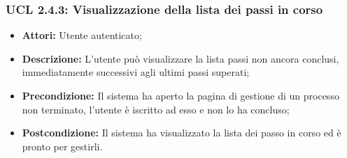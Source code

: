 \subsubsection{UCL 2.4.3: Visualizzazione della lista dei passi in corso}
\begin{itemize}
\item \textbf{Attori:} Utente autenticato;
\item \textbf{Descrizione:} L'utente può visualizzare la lista passi non ancora conclusi, immediatamente successivi agli ultimi passi superati;
\item \textbf{Precondizione:} Il sistema ha aperto la pagina di gestione di un processo non terminato, l'utente è iscritto ad esso e non lo ha concluso;
\item \textbf{Postcondizione:} Il sistema ha visualizzato la lista dei passo in corso ed è pronto per gestirli.
\end{itemize}

\hypertarget{L2.4.4}{}

